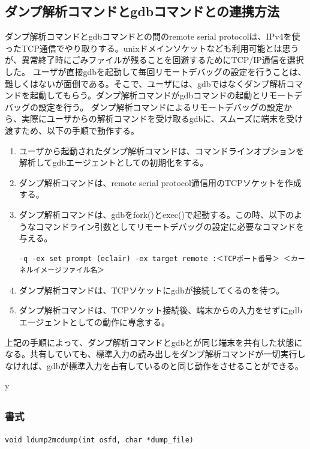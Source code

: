 \documentclass[twoside,11pt,fleqn]{book}
\begin{document}
\subsection{ダンプ解析コマンドとgdbコマンドとの連携方法}
ダンプ解析コマンドとgdbコマンドとの間のremote serial protocolは、IPv4を使ったTCP通信でやり取りする。unixドメインソケットなども利用可能とは思うが、異常終了時にごみファイルが残ることを回避するためにTCP/IP通信を選択した。
ユーザが直接gdbを起動して毎回リモートデバッグの設定を行うことは、難しくはないが面倒である。そこで、ユーザには、gdbではなくダンプ解析コマンドを起動してもらう。ダンプ解析コマンドがgdbコマンドの起動とリモートデバッグの設定を行う。
ダンプ解析コマンドによるリモートデバッグの設定から、実際にユーザからの解析コマンドを受け取るgdbに、スムーズに端末を受け渡すため、以下の手順で動作する。
\begin{enumerate}
\item ユーザから起動されたダンプ解析コマンドは、コマンドラインオプションを解析してgdbエージェントとしての初期化をする。
\item ダンプ解析コマンドは、remote serial protocol通信用のTCPソケットを作成する。
\item ダンプ解析コマンドは、gdbをfork()とexec()で起動する。この時、以下のようなコマンドライン引数としてリモートデバッグの設定に必要なコマンドを与える。\\
\footnotesize
\begin{verbatim}
-q -ex set prompt (eclair) -ex target remote :＜TCPポート番号＞ ＜カーネルイメージファイル名＞
\end{verbatim}
\normalsize
\item ダンプ解析コマンドは、TCPソケットにgdbが接続してくるのを待つ。
\item ダンプ解析コマンドは、TCPソケット接続後、端末からの入力をせずにgdbエージェントとしての動作に専念する。
\end{enumerate}
上記の手順によって、ダンプ解析コマンドとgdbとが同じ端末を共有した状態になる。共有していても、標準入力の読み出しをダンプ解析コマンドが一切実行しなければ、gdbが標準入力を占有しているのと同じ動作をさせることができる。

\ifx \HLDIFFJULTWO y
\subsection{}
\subsubsection*{書式}{\quad} \texttt{void ldump2mcdump(int osfd, char *dump\_file)}
\end{document}
